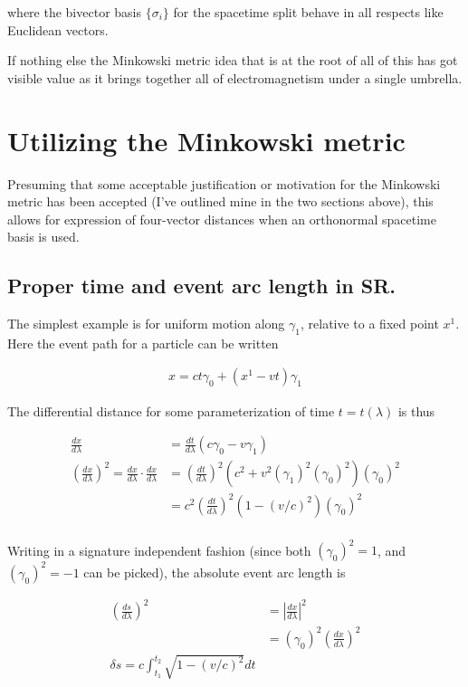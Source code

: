 \documentclass{article}      %
\newcommand{\Abs}[1]{\left\lvert{#1}\right\rvert}
\begin{document}
where the bivector basis $\{\sigma_i\}$ for the spacetime split behave in all respects like Euclidean vectors.

If nothing else the Minkowski metric idea that is at the root of all of this has got visible value as it brings together all
of electromagnetism under a single umbrella.

\section{ Utilizing the Minkowski metric }

Presuming that some acceptable justification or motivation for the Minkowski metric has been accepted (I've outlined mine in the two sections above),
this allows for expression of four-vector distances when an orthonormal spacetime basis is used.

\subsection{ Proper time and event arc length in SR. }

The simplest example is for uniform motion along $\gamma_1$, relative to a fixed point $x^1$.  Here the event path for a particle can be written

\begin{align*}
x = c t \gamma_0 + (x^1 - v t) \gamma_1
\end{align*}

The differential distance for some parameterization of time $t = t(\lambda)$ is thus

\begin{align*}
\frac{dx}{d\lambda} &= \frac{dt}{d\lambda} \left( c \gamma_0 - v \gamma_1 \right) \\
\left({\frac{dx}{d\lambda}}\right)^2 = {\frac{dx}{d\lambda}} \cdot {\frac{dx}{d\lambda}} 
&= \left(\frac{dt}{d\lambda}\right)^2 \left( c^2 + v^2 (\gamma_1)^2 (\gamma_0)^2 \right) (\gamma_0)^2 \\
&= c^2 \left(\frac{dt}{d\lambda}\right)^2 \left( 1 - (v/c)^2 \right) (\gamma_0)^2 \\
\end{align*}

Writing in a signature independent fashion (since both $(\gamma_0)^2 = 1$, and $(\gamma_0)^2 = -1$ can be picked), the absolute 
event arc length is

\begin{align*}
\left(\frac{ds}{d\lambda}\right)^2 &= \Abs{\frac{dx}{d\lambda}}^2  \\
&= (\gamma_0)^2 \left( {\frac{dx}{d\lambda}} \right)^2 \\
\delta s = c \int_{t_1}^{t_2} \sqrt{1 - (v/c)^2} dt
\end{align*}
\end{document}
